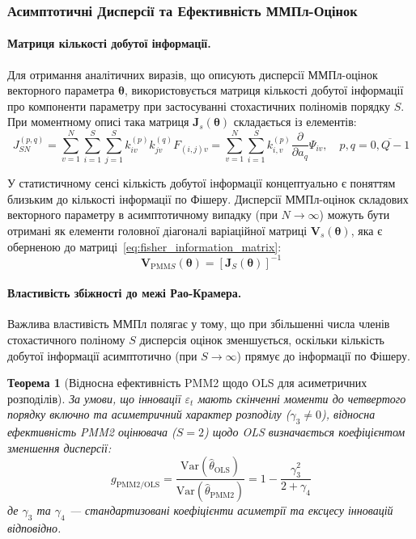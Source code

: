 \documentclass[12pt,a4paper]{article}
\newtheorem{theorem}{Теорема}[section]
\begin{document}
\subsubsection{Асимптотичні Дисперсії та Ефективність ММПл-Оцінок}

\paragraph{Матриця кількості добутої інформації.}

Для отримання аналітичних виразів, що описують дисперсії ММПл-оцінок векторного параметра $\boldsymbol{\theta}$, використовується матриця кількості добутої інформації про компоненти параметру при застосуванні стохастичних поліномів порядку $S$. При моментному описі така матриця $\mathbf{J}_s(\boldsymbol{\theta})$ складається із елементів:
\begin{equation}
\label{eq:fisher_information_matrix}
J_{SN}^{(p,q)} = \sum_{v=1}^{N} \sum_{i=1}^{S} \sum_{j=1}^{S} k_{iv}^{(p)} k_{jv}^{(q)} F_{(i,j)v} = \sum_{v=1}^{N} \sum_{i=1}^{S} k_{i,v}^{(p)} \frac{\partial}{\partial a_q} \Psi_{iv}, \quad p,q=\overline{0,Q-1}
\end{equation}

У статистичному сенсі кількість добутої інформації концептуально є поняттям близьким до кількості інформації по Фішеру. Дисперсії ММПл-оцінок складових векторного параметру в асимптотичному випадку (при $N \to \infty$) можуть бути отримані як елементи головної діагоналі варіаційної матриці $\mathbf{V}_s(\boldsymbol{\theta})$, яка є оберненою до матриці~\eqref{eq:fisher_information_matrix}:
\begin{equation}
\label{eq:variance_matrix}
\mathbf{V}_{\text{PMM}S}(\boldsymbol{\theta}) = \left[\mathbf{J}_S(\boldsymbol{\theta})\right]^{-1}
\end{equation}

\paragraph{Властивість збіжності до межі Рао-Крамера.}

Важлива властивість ММПл полягає у тому, що при збільшенні числа членів стохастичного поліному $S$ дисперсія оцінок зменшується, оскільки кількість добутої інформації асимптотично (при $S \to \infty$) прямує до інформації по Фішеру.

\begin{theorem}[Відносна ефективність PMM2 щодо OLS для асиметричних розподілів]
\label{thm:relative_efficiency_pmm2}
За умови, що інновації $\varepsilon_t$ мають скінченні моменти до четвертого порядку включно та асиметричний характер розподілу ($\gamma_3 \neq 0$), відносна ефективність PMM2 оцінювача ($S=2$) щодо OLS визначається коефіцієнтом зменшення дисперсії:
\begin{equation}
\label{eq:re_pmm2_ols}
g_{\text{PMM2/OLS}} = \frac{\text{Var}(\hat{\theta}_{\text{OLS}})}{\text{Var}(\hat{\theta}_{\text{PMM2}})} = 1 - \frac{\gamma_3^2}{2 + \gamma_4}
\end{equation}
де $\gamma_3$ та $\gamma_4$ --- стандартизовані коефіцієнти асиметрії та ексцесу інновацій відповідно.
\end{theorem}
\end{document}
